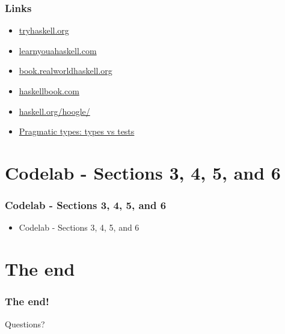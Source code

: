 \documentclass[17pt]{beamer}
\renewcommand{\(}[1]{\begin{columns}[#1]}
\renewcommand{\)}{\end{columns}}
\newcommand{\<}[1]{\begin{column}{#1}}
\renewcommand{\>}{\end{column}}
\begin{document}
\begin{frame}
  \frametitle{Links}
  \begin{itemize}
  \item \href{https://tryhaskell.org}{tryhaskell.org}
  \item \href{https://learnyouahaskell.com}{learnyouahaskell.com}
  \item \href{https://book.realworldhaskell.org}{book.realworldhaskell.org}
  \item \href{http://haskellbook.com}{haskellbook.com}
  \item \href{https://www.haskell.org/hoogle/}{haskell.org/hoogle/}
  \item \href{https://dev.to/stereobooster/pragmatic-types-type-systems-vs-tests-4k3e}{Pragmatic types: types vs tests}
  \end{itemize}
\end{frame}


\section{Codelab - Sections 3, 4, 5, and 6}

\begin{frame}
  \frametitle{Codelab - Sections 3, 4, 5, and 6}
  \begin{itemize}
    \item Codelab - Sections 3, 4, 5, and 6
  \end{itemize}
\end{frame}


\section{The end}

\begin{frame}
  \frametitle{The end!}
  \begin{center}
    Questions?
  \end{center}
\end{frame}

\end{document}
